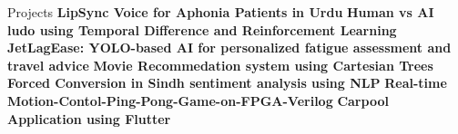 \begin{rubric}{Projects}
\entry*\textbf{LipSync Voice for Aphonia Patients in Urdu}
\entry*\textbf{Human vs AI ludo using Temporal Difference and Reinforcement Learning}
\entry*\textbf{JetLagEase: YOLO-based AI for personalized fatigue assessment and travel advice}
\entry*\textbf{Movie Recommedation system using Cartesian Trees}
\entry*\textbf{Forced Conversion in Sindh sentiment analysis using NLP}
\entry*\textbf{Real-time Motion-Contol-Ping-Pong-Game-on-FPGA-Verilog}
\entry*\textbf{Carpool Application using Flutter}

\end{rubric}